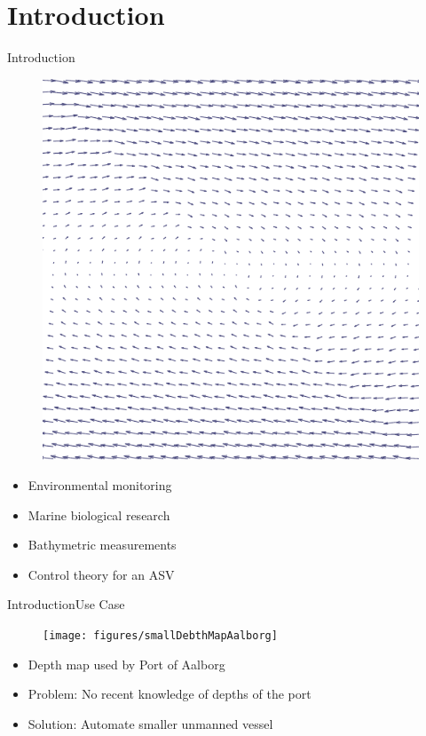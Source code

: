 \section{Introduction}

\begin{frame}{Introduction}{}
    \begin{figure}[H]
        \centering
        \includegraphics[width=.6\linewidth]{figures/frontpage}
    \end{figure}
    \begin{itemize}
         \item Environmental monitoring
         \item Marine biological research
         \item Bathymetric measurements
         \item Control theory for an ASV
    \end{itemize}
\end{frame}

\begin{frame}{Introduction}{Use Case}
    \begin{figure}[H]
        \centering
        \texttt{[image: figures/smallDebthMapAalborg]}
    \end{figure}
    \begin{itemize}
        \item Depth map used by Port of Aalborg 
        \item Problem: No recent knowledge of depths of the port
        \item Solution: Automate smaller unmanned vessel
    \end{itemize}
\end{frame}

